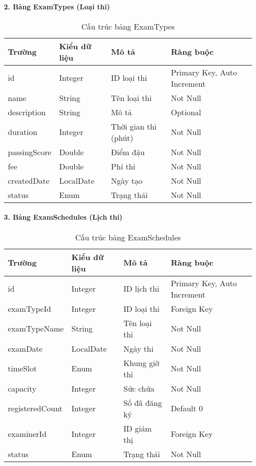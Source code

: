 \documentclass[12pt,a4paper]{article}
\begin{document}
\paragraph{2. Bảng ExamTypes (Loại thi)}
\begin{table}[H]
\centering
\begin{tabular}{|l|l|l|l|}
\hline
\textbf{Trường} & \textbf{Kiểu dữ liệu} & \textbf{Mô tả} & \textbf{Ràng buộc} \\
\hline
id & Integer & ID loại thi & Primary Key, Auto Increment \\
\hline
name & String & Tên loại thi & Not Null \\
\hline
description & String & Mô tả & Optional \\
\hline
duration & Integer & Thời gian thi (phút) & Not Null \\
\hline
passingScore & Double & Điểm đậu & Not Null \\
\hline
fee & Double & Phí thi & Not Null \\
\hline
createdDate & LocalDate & Ngày tạo & Not Null \\
\hline
status & Enum & Trạng thái & Not Null \\
\hline
\end{tabular}
\caption{Cấu trúc bảng ExamTypes}
\label{tab:examtypes_structure}
\end{table}

\paragraph{3. Bảng ExamSchedules (Lịch thi)}
\begin{table}[H]
\centering
\begin{tabular}{|l|l|l|l|}
\hline
\textbf{Trường} & \textbf{Kiểu dữ liệu} & \textbf{Mô tả} & \textbf{Ràng buộc} \\
\hline
id & Integer & ID lịch thi & Primary Key, Auto Increment \\
\hline
examTypeId & Integer & ID loại thi & Foreign Key \\
\hline
examTypeName & String & Tên loại thi & Not Null \\
\hline
examDate & LocalDate & Ngày thi & Not Null \\
\hline
timeSlot & Enum & Khung giờ thi & Not Null \\
\hline
capacity & Integer & Sức chứa & Not Null \\
\hline
registeredCount & Integer & Số đã đăng ký & Default 0 \\
\hline
examinerId & Integer & ID giám thị & Foreign Key \\
\hline
status & Enum & Trạng thái & Not Null \\
\hline
\end{tabular}
\caption{Cấu trúc bảng ExamSchedules}
\label{tab:examschedules_structure}
\end{table}
\end{document}
